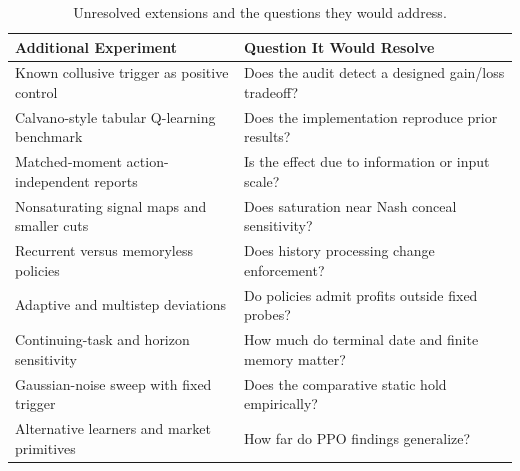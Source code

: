 \documentclass{article}
\begin{document}
\begin{table}[t]
\centering
\caption{Unresolved extensions and the questions they would address.}
\label{tab:extensions}
\small
\begin{tabular}{@{}ll@{}}
\toprule
Additional Experiment & Question It Would Resolve \\
\midrule
Known collusive trigger as positive control & Does the audit detect a designed gain/loss tradeoff? \\
Calvano-style tabular Q-learning benchmark & Does the implementation reproduce prior results? \\
Matched-moment action-independent reports & Is the effect due to information or input scale? \\
Nonsaturating signal maps and smaller cuts & Does saturation near Nash conceal sensitivity? \\
Recurrent versus memoryless policies & Does history processing change enforcement? \\
Adaptive and multistep deviations & Do policies admit profits outside fixed probes? \\
Continuing-task and horizon sensitivity & How much do terminal date and finite memory matter? \\
Gaussian-noise sweep with fixed trigger & Does the comparative static hold empirically? \\
Alternative learners and market primitives & How far do PPO findings generalize? \\
\bottomrule
\end{tabular}
\end{table}

\end{document}
